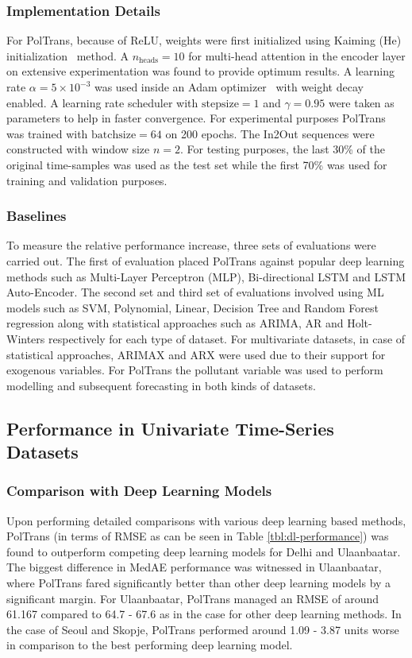 \documentclass[twocolumn]{svjour3}          %
\begin{document}
\subsubsection{Implementation Details}
For {PolTrans}, because of ReLU, weights were first initialized using Kaiming (He) initialization~\cite{He.2015} method. A ${n_{\text{heads}} = 10}$ for multi-head attention in the encoder layer on extensive experimentation was found to provide optimum results. A learning rate ${\alpha = 5 \times 10^{-3}}$ was used inside an Adam optimizer~\cite{Kingma.2014} with weight decay enabled. A learning rate scheduler with ${\mathrm{stepsize} = 1}$ and ${\gamma = 0.95}$ were taken as parameters to help in faster convergence. For experimental purposes {PolTrans} was trained with ${\mathrm{batchsize} = 64}$ on 200 epochs. The In2Out sequences were constructed with window size ${n = 2}$. For testing purposes, the last 30\% of the original time-samples was used as the test set while the first 70\% was used for training and validation purposes.

\subsubsection{Baselines}
To measure the relative performance increase, three sets of evaluations were carried out. The first of evaluation placed {PolTrans} against popular deep learning methods such as Multi-Layer Perceptron (MLP), Bi-directional LSTM and LSTM Auto-Encoder. The second set and third set of evaluations involved using ML models such as SVM, Polynomial, Linear, Decision Tree and Random Forest regression along with statistical approaches such as ARIMA, AR and Holt-Winters respectively for each type of dataset.
For multivariate datasets, in case of statistical approaches, ARIMAX and ARX were used due to their support for exogenous variables. For {PolTrans} the pollutant variable was used to perform modelling and subsequent forecasting in both kinds of datasets.

\subsection{Performance in Univariate Time-Series Datasets}

\subsubsection{Comparison with Deep Learning Models}

Upon performing detailed comparisons with various deep learning based methods, {PolTrans} (in terms of RMSE as can be seen in Table \ref{tbl:dl-performance}) was found to outperform competing deep learning models for Delhi and Ulaanbaatar. The biggest difference in MedAE performance was witnessed in Ulaanbaatar, where {PolTrans} fared significantly better than other deep learning models by a significant margin. For Ulaanbaatar, {PolTrans} managed an RMSE of around 61.167 compared to 64.7 - 67.6 as in the case for other deep learning methods. In the case of Seoul and Skopje, {PolTrans} performed around 1.09 - 3.87 units worse in comparison to the best performing deep learning model.
\end{document}
